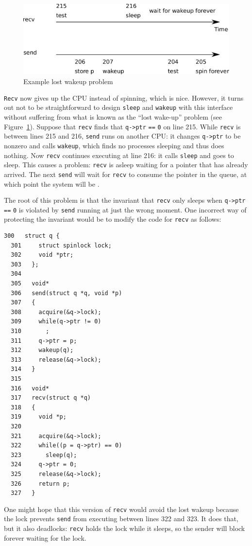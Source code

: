 \begin{figure}[t]
\center
\includegraphics[scale=0.5]{fig/deadlock.pdf}
\caption{Example lost wakeup problem}
\label{fig:deadlock}
\end{figure}

\lstinline{Recv}
now gives up the CPU instead of spinning, which is nice.
However, it turns out not to be straightforward to design
\lstinline{sleep}
and 
\lstinline{wakeup}
with this interface without suffering
from what is known as the ``lost wake-up'' problem (see 
Figure~\ref{fig:deadlock}).
Suppose that
\lstinline{recv}
finds that
\lstinline{q->ptr}
\lstinline{==}
\lstinline{0} 
on line 215.
While
\lstinline{recv}
is between lines 215 and 216,
\lstinline{send}
runs on another CPU:
it changes
\lstinline{q->ptr}
to be nonzero and calls
\lstinline{wakeup},
which finds no processes sleeping and thus does nothing.
Now
\lstinline{recv}
continues executing at line 216:
it calls
\lstinline{sleep}
and goes to sleep.
This causes a problem:
\lstinline{recv}
is asleep waiting for a pointer
that has already arrived.
The next
\lstinline{send}
will wait for 
\lstinline{recv}
to consume the pointer in the queue,
at which point the system will be 
.

The root of this problem is that the
invariant that
\lstinline{recv}
only sleeps when
\lstinline{q->ptr}
\lstinline{==}
\lstinline{0}
is violated by 
\lstinline{send}
running at just the wrong moment.
One incorrect way of protecting the invariant would be to modify the code for
\lstinline{recv}
as follows:
\begin{lstlisting}[]
  300	struct q {
  301	  struct spinlock lock;
  302	  void *ptr;
  303	};
  304	
  305	void*
  306	send(struct q *q, void *p)
  307	{
  308	  acquire(&q->lock);
  309	  while(q->ptr != 0)
  310	    ;
  311	  q->ptr = p;
  312	  wakeup(q);
  313	  release(&q->lock);
  314	}
  315	
  316	void*
  317	recv(struct q *q)
  318	{
  319	  void *p;
  320	
  321	  acquire(&q->lock);
  322	  while((p = q->ptr) == 0)
  323	    sleep(q);
  324	  q->ptr = 0;
  325	  release(&q->lock);
  326	  return p;
  327	}
\end{lstlisting}
One might hope that this version of
\lstinline{recv}
would avoid the lost wakeup because the lock prevents
\lstinline{send}
from executing between lines 322 and 323.
It does that, but it also deadlocks:
\lstinline{recv}
holds the lock while it sleeps,
so the sender will block forever waiting for the lock.

